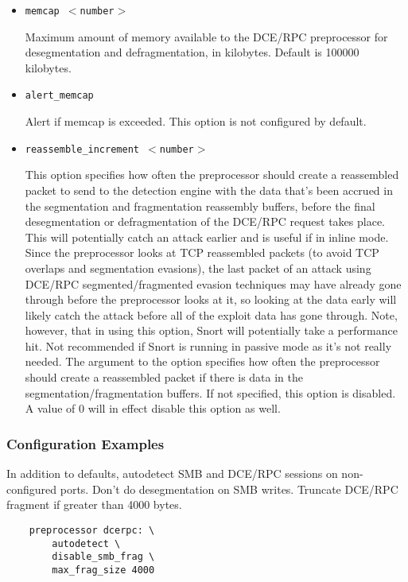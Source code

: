 \documentclass[english]{report}
\begin{document}
\begin{itemize}
\item \texttt{memcap $<$number$>$}
\newline

Maximum amount of memory available to the DCE/RPC preprocessor for
desegmentation and defragmentation, in kilobytes.  Default is 100000 kilobytes.

\item \texttt{alert\_memcap}
\newline

Alert if memcap is exceeded.  This option is not configured by default.

\item \texttt{reassemble\_increment $<$number$>$}
\newline

This option specifies how often the preprocessor should create a reassembled
packet to send to the detection engine with the data that's been accrued in the
segmentation and fragmentation reassembly buffers, before the final
desegmentation or defragmentation of the DCE/RPC request takes place.  This
will potentially catch an attack earlier and is useful if in inline mode.
Since the preprocessor looks at TCP reassembled packets (to avoid TCP overlaps
and segmentation evasions), the last packet of an attack using DCE/RPC
segmented/fragmented evasion techniques may have already gone through before
the preprocessor looks at it, so looking at the data early will likely catch
the attack before all of the exploit data has gone through.  Note, however,
that in using this option, Snort will potentially take a performance hit.  Not
recommended if Snort is running in passive mode as it's not really needed.  The
argument to the option specifies how often the preprocessor should create a
reassembled packet if there is data in the segmentation/fragmentation buffers.
If not specified, this option is disabled.  A value of 0 will in effect disable
this option as well.

\end{itemize}

\subsubsection{Configuration Examples}

In addition to defaults, autodetect SMB and DCE/RPC sessions on non-configured
ports.  Don't do desegmentation on SMB writes.  Truncate DCE/RPC fragment if
greater than 4000 bytes.

\begin{verbatim}
    preprocessor dcerpc: \
        autodetect \
        disable_smb_frag \
        max_frag_size 4000
\end{verbatim}
\end{document}
